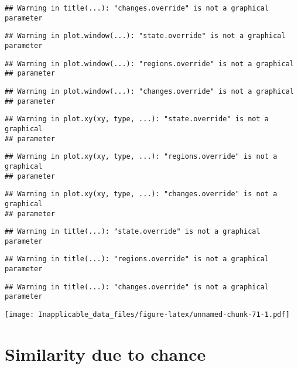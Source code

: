 \documentclass[]{book}
\theoremstyle{definition}
\theoremstyle{definition}
\theoremstyle{definition}
\theoremstyle{remark}
\begin{document}
\begin{verbatim}
## Warning in title(...): "changes.override" is not a graphical parameter
\end{verbatim}

\begin{verbatim}
## Warning in plot.window(...): "state.override" is not a graphical parameter
\end{verbatim}

\begin{verbatim}
## Warning in plot.window(...): "regions.override" is not a graphical
## parameter
\end{verbatim}

\begin{verbatim}
## Warning in plot.window(...): "changes.override" is not a graphical
## parameter
\end{verbatim}

\begin{verbatim}
## Warning in plot.xy(xy, type, ...): "state.override" is not a graphical
## parameter
\end{verbatim}

\begin{verbatim}
## Warning in plot.xy(xy, type, ...): "regions.override" is not a graphical
## parameter
\end{verbatim}

\begin{verbatim}
## Warning in plot.xy(xy, type, ...): "changes.override" is not a graphical
## parameter
\end{verbatim}

\begin{verbatim}
## Warning in title(...): "state.override" is not a graphical parameter
\end{verbatim}

\begin{verbatim}
## Warning in title(...): "regions.override" is not a graphical parameter
\end{verbatim}

\begin{verbatim}
## Warning in title(...): "changes.override" is not a graphical parameter
\end{verbatim}

\texttt{[image: Inapplicable\_data\_files/figure-latex/unnamed-chunk-71-1.pdf]}

\section{Similarity due to chance}\label{similarity-due-to-chance}
\end{document}
